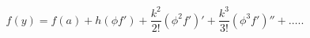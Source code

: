 \begin{equation}
f(y)=f(a)+ h(\phi f') + \frac{k^2}{2!} (\phi^2 f')'+\frac{k^3}{3!}
(\phi^3 f')''+ \dots. \label{exp}.
\end{equation}

